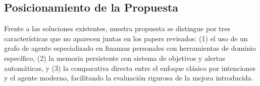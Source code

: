 \subsection{Posicionamiento de la Propuesta}
\label{subsec:posicionamiento}

Frente a las soluciones existentes, nuestra propuesta se distingue por tres características que no aparecen juntas en los papers revisados: (1) el uso de un grafo de agente especializado en finanzas personales con herramientas de dominio específico, (2) la memoria persistente con sistema de objetivos y alertas automáticas, y (3) la comparativa directa entre el enfoque clásico por intenciones y el agente moderno, facilitando la evaluación rigurosa de la mejora introducida.